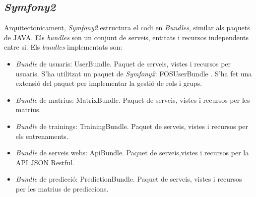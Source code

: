 \subsection{\textit{Symfony2}}
Arquitectonicament, \textit{Symfony2} estructura el codi en \textit{Bundles}, similar als paquets de JAVA. Els \textit{bundles} son un conjunt de serveis, entitats i recursos independents entre si. Els \textit{bundles} implementats son:
\begin{itemize}
\item \textit{Bundle} de usuaris: UserBundle. Paquet de serveis, vistes i recursos per usuaris. S'ha utilitzat un paquet de \textit{Symfony2}: FOSUserBundle \cite{fosuserbundle}. S'ha fet una extensi\'{o} del paquet per implementar la gesti\'{o} de rols i grups.
\item \textit{Bundle} de matrius: MatrixBundle. Paquet de serveis, vistes i recursos per les matrius.
\item \textit{Bundle} de trainings: TrainingBundle. Paquet de serveis, vistes i recursos per els entrenaments.
\item \textit{Bundle} de serveis webs: ApiBundle. Paquet de serveis,vistes i recursos per la API JSON Restful. 
\item \textit{Bundle} de predicci\'{o}: PredictionBundle. Paquet de serveis, vistes i recursos per les matrius de prediccions.
\end{itemize}

